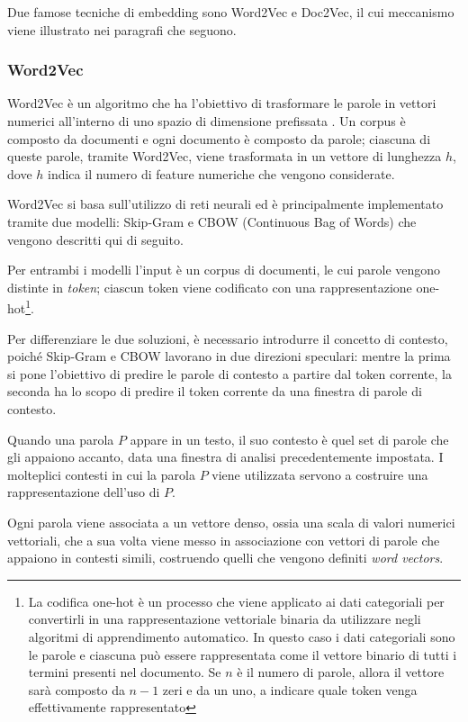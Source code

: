 \documentclass[12pt]{report}
\theoremstyle{definition}
\begin{document}
Due famose tecniche di embedding sono Word2Vec e Doc2Vec, il cui meccanismo viene illustrato nei paragrafi che seguono.
\subsubsection{Word2Vec} \label{w2v}
Word2Vec è un algoritmo che ha l'obiettivo di trasformare le parole in vettori numerici all'interno di uno spazio  di dimensione prefissata \cite{3}.
Un corpus è composto da documenti e ogni documento è composto da parole; ciascuna di queste parole, tramite Word2Vec, viene trasformata in un vettore di lunghezza $h$, dove $h$ indica il numero di feature numeriche che vengono considerate. 

Word2Vec si basa sull'utilizzo di reti neurali \cite{3} ed è principalmente implementato tramite due modelli: Skip-Gram e CBOW (Continuous Bag of Words) che vengono descritti qui di seguito.

Per entrambi i modelli l'input è un corpus di documenti, le cui parole vengono distinte in \textit{token}; ciascun token viene codificato con una rappresentazione one-hot\footnote{La codifica one-hot è un processo che viene applicato ai dati categoriali per convertirli in una rappresentazione vettoriale binaria da utilizzare negli algoritmi di apprendimento automatico. In questo caso i dati categoriali sono le parole e ciascuna può essere rappresentata come il vettore binario di tutti i termini presenti nel documento. Se $n$ è il numero di parole, allora il vettore sarà composto da $n-1$ zeri e da un uno, a indicare quale token venga effettivamente rappresentato}.

Per differenziare le due soluzioni, è necessario introdurre il concetto di contesto, poiché Skip-Gram e CBOW lavorano in due direzioni speculari:
mentre la prima si pone l'obiettivo di predire le parole di contesto a partire dal token corrente, la seconda ha lo scopo di predire il token corrente da una finestra di parole di contesto.

Quando una parola $P$ appare in un testo, il suo contesto è quel set di parole che gli appaiono accanto, data una finestra di analisi precedentemente impostata. I molteplici contesti in cui la parola $P$ viene utilizzata servono a costruire una rappresentazione dell’uso di $P$.

Ogni parola viene associata a un vettore denso, ossia una scala di valori numerici vettoriali, che a sua volta viene messo in associazione con vettori di parole che appaiono in contesti simili, costruendo quelli che vengono definiti \textit{word vectors}.
\end{document}
